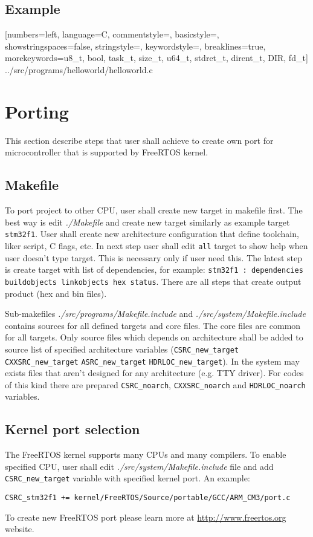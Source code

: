 \documentclass[a4paper,11pt]{report}
\renewcommand{\path}[1]{\textit{#1}}
\newcommand{\code}[1]{\texttt{#1}}
\newcommand{\includecode}[1]{
    [numbers=left, language=C, commentstyle=\color{commcolor}, basicstyle=\scriptsize\ttfamily,
    showstringspaces=false, stringstyle=\color{stringcolor}, keywordstyle=\color{keywordcolor},
    breaklines=true,
    morekeywords={u8_t, bool, task_t, size_t, u64_t, stdret_t, dirent_t, DIR, fd_t}]
    {#1}}
\begin{document}
\section{Example}
\includecode{../src/programs/helloworld/helloworld.c}


\chapter{Porting}\label{sec:porting}
This section describe steps that user shall achieve to create own port for microcontroller that is
supported by FreeRTOS kernel.

\section{Makefile}
To port project to other CPU, user shall create new target in makefile first. The best way is
edit \path{./Makefile} and create new target similarly as example target \code{stm32f1}.
User shall create new architecture configuration that define toolchain, liker script, C flags, etc.
In next step user shall edit \code{all} target to show help when user doesn't type target. This
is necessary only if user need this. The latest step is create target with list of dependencies,
for example: \code{stm32f1 : dependencies buildobjects linkobjects hex status}. There are all
steps that create output product (hex and bin files).

Sub-makefiles \path{./src/programs/Makefile.include} and \path{./src/system/Makefile.include} contains
sources for all defined targets and core files. The core files are common for all targets. Only
source files which depends on architecture shall be added to source list of specified architecture
variables (\code{CSRC\_new\_target} \code{CXXSRC\_new\_target} \code{ASRC\_new\_target}
\code{HDRLOC\_new\_target}). In the system may exists files that aren't designed for any architecture
(e.g. TTY driver). For codes of this kind there are prepared \code{CSRC\_noarch},
\code{CXXSRC\_noarch} and \code{HDRLOC\_noarch} variables.

\section{Kernel port selection}
The FreeRTOS kernel supports many CPUs and many compilers. To enable specified CPU, user shall edit
\path{./src/system/Makefile.include} file and add \code{CSRC\_new\_target} variable with
specified kernel port. An example:
\begin{center}
   \code{CSRC\_stm32f1 += kernel/FreeRTOS/Source/portable/GCC/ARM\_CM3/port.c}
\end{center}
To create new FreeRTOS port please learn more at \url{http://www.freertos.org}
website.
\end{document}
